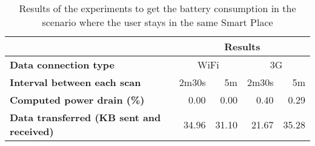 \begin{table}[]
\centering
\begin{tabular}{@{}|l|r|r|r|r|@{}}
\toprule
\textbf{}                                        & \multicolumn{4}{c|}{\textbf{Results}}               \\ \midrule
\textbf{Data connection type}                    & \multicolumn{2}{c|}{WiFi} & \multicolumn{2}{c|}{3G} \\ \midrule
\textbf{Interval between each scan}              & 2m30s       & 5m          & 2m30s      & 5m         \\ \midrule
\textbf{Computed power drain (\%)}               & 0.00        & 0.00        & 0.40       & 0.29       \\ \midrule
\textbf{Data transferred (KB sent and received)} & 34.96       & 31.10       & 21.67      & 35.28      \\ \bottomrule
\end{tabular}
\caption[Power drain when the user is not moving]{Results of the experiments to get the battery consumption in the scenario where the user stays in the same Smart Place}
\label{tab:results_battery_stopped}
\end{table}
